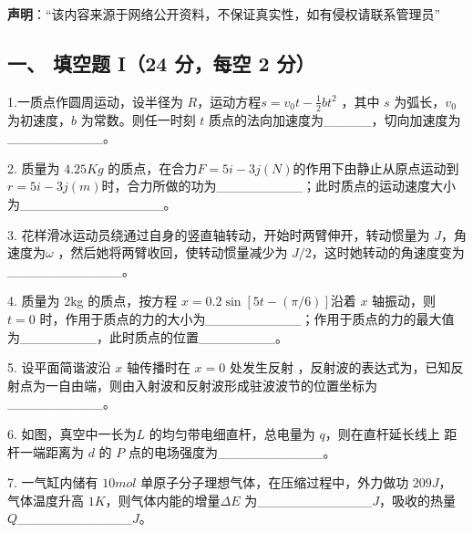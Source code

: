 
\textbf{声明}：“该内容来源于网络公开资料，不保证真实性，如有侵权请联系管理员”

\subsection{一、 填空题 I（24 分，每空 2 分）}
1.一质点作圆周运动，设半径为 $R$，运动方程$s=v_0t-\frac{1}{2}bt^2$ ，其中 $s$ 为弧长，$v_0$为初速度，$b$ 为常数。则任一时刻 $t$ 质点的法向加速度为_____，切向加速度为__________。

2. 质量为 $4.25Kg$ 的质点，在合力$F=5i-3j(N)$的作用下由静止从原点运动到$r=5i-3j(m)$时，合力所做的功为_________；此时质点的运动速度大小为_______________。

3. 花样滑冰运动员绕通过自身的竖直轴转动，开始时两臂伸开，转动惯量为 $J$，角速度为$\omega$ ，然后她将两臂收回，使转动惯量减少为 $J/2$，这时她转动的角速度变为____________。

4. 质量为 2kg 的质点，按方程 $x=0.2\sin[5t-(\pi/6)]$沿着 $x$ 轴振动，则 $t=0$ 时，作用于质点的力的大小为__________；作用于质点的力的最大值为________，此时质点的位置________。

5. 设平面简谐波沿 $x$ 轴传播时在 $x=0$ 处发生反射 ，反射波的表达式为，已知反射点为一自由端，则由入射波和反射波形成驻波波节的位置坐标为__________。

6. 如图，真空中一长为$L$ 的均匀带电细直杆，总电量为 $q$，则在直杆延长线上
距杆一端距离为 $d$ 的 $P$ 点的电场强度为___________。

7. 一气缸内储有 $10mol$ 单原子分子理想气体，在压缩过程中，外力做功 $209J$，
气体温度升高 $1K$，则气体内能的增量$\Delta E$ 为____________$J$，吸收的热量 $Q $____________$J$。